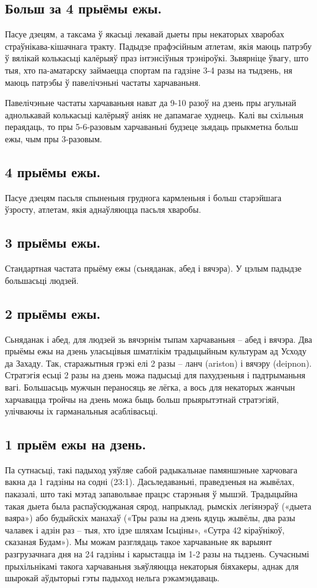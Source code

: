 \subsection{Больш за 4 прыёмы ежы.}
Пасуе дзецям, а таксама ў якасьці лекавай дыеты пры некаторых хваробах страўнікава-кішачнага тракту. Падыдзе прафэсійным атлетам, якія маюць патрэбу ў вялікай колькасьці калёрыяў праз інтэнсіўныя трэніроўкі. Зьвярніце ўвагу, што тыя, хто па-аматарску займаецца спортам па гадзіне 3-4 разы на тыдзень, ня маюць патрэбы ў павелічэньні частаты харчаваньня.

Павелічэньне частаты харчаваньня нават да 9-10 разоў на дзень пры агульнай аднолькавай колькасьці калёрыяў аніяк не дапамагае худнець. Калі вы схільныя пераядаць, то пры 5-6-разовым харчаваньні будзеце зьядаць прыкметна больш ежы, чым пры 3-разовым.

\subsection{4 прыёмы ежы.}
Пасуе дзецям пасьля спыненьня груднога кармленьня і больш старэйшага ўзросту, атлетам, якія аднаўляюцца пасьля хваробы.

\subsection{3 прыёмы ежы.}
Стандартная частата прыёму ежы (сьняданак, абед і вячэра). У цэлым падыдзе большасьці людзей.

\subsection{2 прыёмы ежы.}
Сьняданак і абед, для людзей зь вячэрнім тыпам харчаваньня – абед і вячэра. Два прыёмы ежы на дзень уласьцівыя шматлікім традыцыйным культурам ад Усходу да Захаду. Так, старажытныя грэкі елі 2 разы – ланч (ariston) і вячэру (deipnon). Стратэгія есьці 2 разы на дзень можа падысьці для пахудзеньня і падтрыманьня вагі. Большасьць мужчын пераносяць яе лёгка, а вось для некаторых жанчын харчавацца тройчы на дзень можа быць больш прыярытэтнай стратэгіяй, улічваючы іх гарманальныя асаблівасьці.

\subsection{1 прыём ежы на дзень.}
Па сутнасьці, такі падыход уяўляе сабой радыкальнае памяншэньне харчовага вакна да 1 гадзіны на содні (23:1). Дасьледаваньні, праведзеныя на жывёлах, паказалі, што такі мэтад запавольвае працэс старэньня ў мышэй. Традыцыйна такая дыета была распаўсюджаная сярод, напрыклад, рымскіх легіянэраў («дыета ваяра») або будыйскіх манахаў («Тры разы на дзень ядуць жывёлы, два разы чалавек і адзін раз – тыя, хто ідзе шляхам Ісьціны», «Сутра 42 кіраўнікоў, сказаная Будам»). Мы можам разглядаць такое харчаваньне як варыянт разгрузачнага дня на 24 гадзіны і карыстацца ім 1-2 разы на тыдзень. Сучаснымі прыхільнікамі такога харчаваньня зьяўляюцца некаторыя біяхакеры, аднак для шырокай аўдыторыі гэты падыход нельга рэкамэндаваць.

